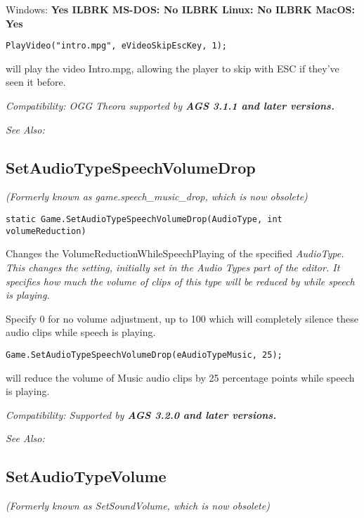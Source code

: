Windows: \bf{ Yes }ILBRK
MS-DOS: \bf{ No }ILBRK
Linux: \bf{ No }ILBRK
MacOS: \bf{ Yes }

\begin{verbatim}
PlayVideo("intro.mpg", eVideoSkipEscKey, 1);
\end{verbatim}
will play the video Intro.mpg, allowing the player to skip with ESC if they've seen it
before.

\it{Compatibility:} OGG Theora supported by \bf{AGS 3.1.1} and later versions.

\it{See Also:} 


\subsection{SetAudioTypeSpeechVolumeDrop}\label{Game.SetAudioTypeSpeechVolumeDrop}%

\it{(Formerly known as game.speech_music_drop, which is now obsolete)}

\begin{verbatim}
static Game.SetAudioTypeSpeechVolumeDrop(AudioType, int volumeReduction)
\end{verbatim}
Changes the VolumeReductionWhileSpeechPlaying of the specified \it{AudioType}. This changes
the setting, initially set in the Audio Types part of the editor. It specifies how much
the volume of clips of this type will be reduced by while speech is playing.

Specify 0 for no volume adjustment, up to 100 which will completely silence these audio
clips while speech is playing.

\begin{verbatim}
Game.SetAudioTypeSpeechVolumeDrop(eAudioTypeMusic, 25);
\end{verbatim}
will reduce the volume of Music audio clips by 25 percentage points while speech is playing.

\it{Compatibility:} Supported by \bf{AGS 3.2.0} and later versions.

\it{See Also:} 


\subsection{SetAudioTypeVolume}\label{Game.SetAudioTypeVolume}%

\it{(Formerly known as SetSoundVolume, which is now obsolete)}

